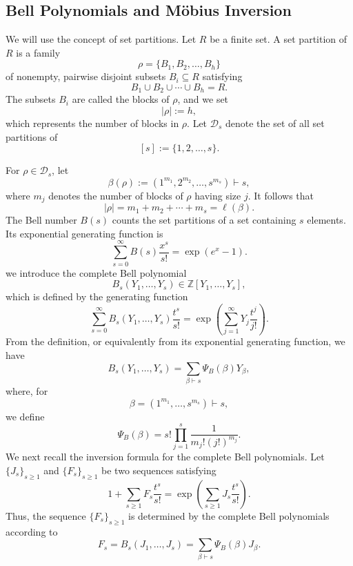\documentclass[12pt,oneside,reqno]{amsart}
\numberwithin{equation}{section}
\begin{document}
	\subsection{Bell Polynomials and M\"obius Inversion}
	We will use the concept of set partitions. Let $R$ be a finite set.
	A set partition of $R$ is a family
	\[
	\rho=\{B_1,B_2,\ldots,B_h\}
	\]
	of nonempty, pairwise disjoint subsets $B_i\subseteq R$ satisfying
	\[
	B_1\cup B_2\cup\cdots\cup B_h=R.
	\]
	The subsets $B_i$ are called the blocks of $\rho$, and we set
	\[
	|\rho|:=h,
	\]
	which represents the number of blocks in $\rho$. Let $\mathscr{D}_s$
	denote the set of all set partitions of
	\[
	[s]:=\{1,2,\ldots,s\}.
	\]
	
	For $\rho\in\mathscr{D}_s$, let
	\[
	\beta(\rho):=(1^{m_1},2^{m_2},\ldots,s^{m_s})\vdash s,
	\]
	where $m_j$ denotes the number of blocks of $\rho$ having size $j$.
	It follows that
	\[
	|\rho|=m_1+m_2+\cdots+m_s=\ell(\beta).
	\]
	The Bell number $B(s)$ counts the set partitions of a set containing
	$s$ elements. Its exponential generating function is
	\[
	\sum_{s=0}^{\infty}B(s)\frac{x^s}{s!}
	=
	\exp(e^x-1).
	\]
	we introduce the complete Bell polynomial
	\[
	B_s(Y_1,\ldots,Y_s)\in\mathbb{Z}[Y_1,\ldots,Y_s],
	\]
	which is defined by the generating function
	\begin{equation}\label{2e1}
		\sum_{s=0}^{\infty} B_s(Y_1,\ldots,Y_s)\frac{t^s}{s!}
		=
		\exp\left(\sum_{j=1}^{\infty}Y_j\frac{t^j}{j!}\right).
	\end{equation}
	From the definition, or equivalently from its exponential generating
	function, we have
	\begin{equation}\label{2e2}
		B_s(Y_1,\ldots,Y_s)
		=
		\sum_{\beta\vdash s}
		\Psi_B(\beta)Y_\beta,
	\end{equation}
	where, for
	\[
	\beta=(1^{m_1},\ldots,s^{m_s})\vdash s,
	\]
	we define
	\begin{equation}\label{2e3}
		\Psi_B(\beta)
		=
		s!\prod_{j=1}^{s}
		\frac{1}{m_j!(j!)^{m_j}}.
	\end{equation}
	We next recall the inversion formula for the complete Bell polynomials. Let
	$\{J_s\}_{s\geq 1}$ and $\{F_s\}_{s\geq 1}$ be two sequences satisfying
	\begin{equation}\label{2e4}
		1+\sum_{s\geq 1}F_s\frac{t^s}{s!}
		=
		\exp\left(\sum_{s\geq 1}J_s\frac{t^s}{s!}\right).
	\end{equation}
	Thus, the sequence $\{F_s\}_{s\geq 1}$ is determined by the complete Bell
	polynomials according to
	\begin{equation}\label{2e5}
		F_s
		=
		B_s(J_1,\ldots,J_s)
		=
		\sum_{\beta\vdash s}
		\Psi_B(\beta)J_\beta.
	\end{equation}
\end{document}
